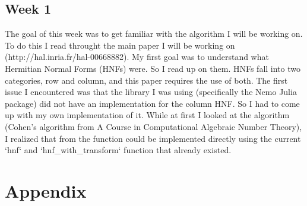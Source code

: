 \documentclass[oneside, a4paper, onecolumn, 11pt]{article}
\begin{document}
\subsection{Week 1}

The goal of this week was to get familiar with the algorithm I will be working on. To do this I read throught the main paper I will be working on (http://hal.inria.fr/hal-00668882). My first goal was to understand what Hermitian Normal Forms (HNFs) were. So I read up on them. HNFs fall into two categories, row and column, and this paper requires the use of both. The first issue I encountered was that the library I was using (specifically the Nemo Julia package) did not have an implementation for the column HNF. So I had to come up with my own implementation of it. While at first I looked at the algorithm (Cohen's algorithm from A Course in Computational Algebraic Number Theory), I realized that from the function could be implemented directly using the current `hnf` and `hnf\_with\_transform` function that already existed.

\newpage



\newpage
\appendix

\section{Appendix}
\label{sec:appendix}
\end{document}
